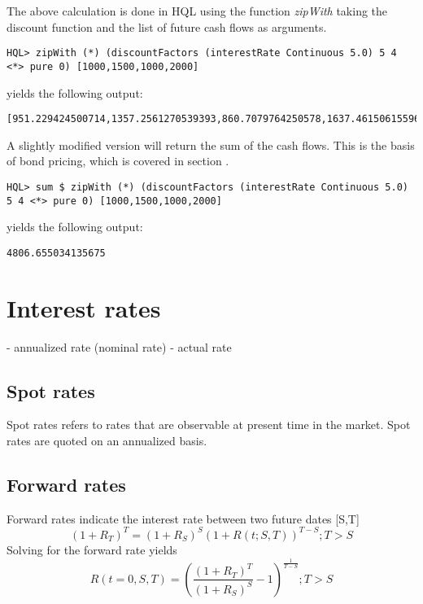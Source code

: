 \documentclass[11pt,a4paper]{article}
\numberwithin{equation}{section}
\begin{document}
The above calculation is done in HQL using the function \textit{zipWith} taking the discount function and the list of future cash flows as arguments.
\FrameSep
\begin{lstlisting}
HQL> zipWith (*) (discountFactors (interestRate Continuous 5.0) 5 4 <*> pure 0) [1000,1500,1000,2000]
\end{lstlisting}
\FrameSep
yields the following output:
\FrameSep
\begin{lstlisting}[style=Output]
[951.229424500714,1357.2561270539393,860.7079764250578,1637.4615061559637]
\end{lstlisting}
\FrameSep
A slightly modified version will return the sum of the cash flows. This is the basis of bond pricing, which is covered in section .
\FrameSep
\begin{lstlisting}
HQL> sum $ zipWith (*) (discountFactors (interestRate Continuous 5.0) 5 4 <*> pure 0) [1000,1500,1000,2000]
\end{lstlisting}
\FrameSep
yields the following output:
\FrameSep
\begin{lstlisting}[style=Output]
4806.655034135675
\end{lstlisting}


\section{Interest rates}

- annualized rate (nominal rate)
- actual rate


\subsection{Spot rates}
Spot rates refers to rates that are observable at present time in the market.
Spot rates are quoted on an annualized basis.

\subsection{Forward rates}
Forward rates indicate the interest rate between two future dates [S,T]
\[
(1+R_T)^T=(1+R_S)^S(1+R(t;S,T))^{T-S}; T>S
\]
Solving for the forward rate yields
\[
R(t=0,S,T)=\left( \frac{(1+R_T)^T}{(1+R_S)^S} - 1 \right)^{\frac{1}{T-S}};T>S
\]
\end{document}
